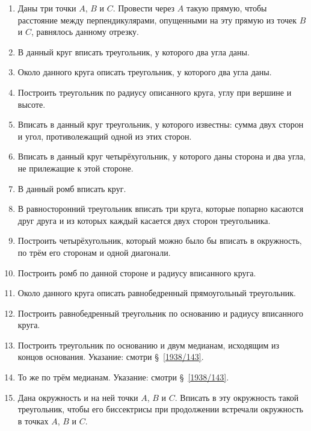 \begin{enumerate}[resume]
\item
Даны три точки $A$, $B$ и $C$.
Провести через $A$ такую прямую, чтобы расстояние между перпендикулярами, опущенными на эту прямую из точек $B$ и $C$, равнялось данному отрезку.

\item
В данный круг вписать треугольник, у которого два угла даны.

\item
Около данного круга описать треугольник, у которого два угла даны.

\item
Построить треугольник по радиусу описанного круга, углу при вершине и высоте.

\item
Вписать в данный круг треугольник, у которого известны:
сумма двух сторон и угол, противолежащий одной из этих сторон.

\item
Вписать в данный круг четырёхугольник, у которого даны сторона и два угла, не прилежащие к этой стороне.

\item
В данный ромб вписать круг.

\item
В равносторонний треугольник вписать три круга, которые попарно касаются друг друга и из которых каждый касается двух сторон треугольника.

\item
Построить четырёхугольник, который можно было бы вписать в окружность, по трём его сторонам и одной диагонали.

\item
Построить ромб по данной стороне и радиусу вписанного круга.

\item
Около данного круга описать равнобедренный прямоугольный треугольник.

\item
Построить равнобедренный треугольник по основанию и радиусу вписанного круга.

\item
Построить треугольник по основанию и двум медианам, исходящим из концов основания.
Указание: смотри §~\ref{1938/143}.

\item
То же по трём медианам.
Указание: смотри §~\ref{1938/143}.

\item
Дана окружность и на ней точки $A$, $B$ и $C$.
Вписать в эту окружность такой треугольник, чтобы его биссектрисы при продолжении встречали окружность в точках $A$, $B$ и $C$.


\end{enumerate}
